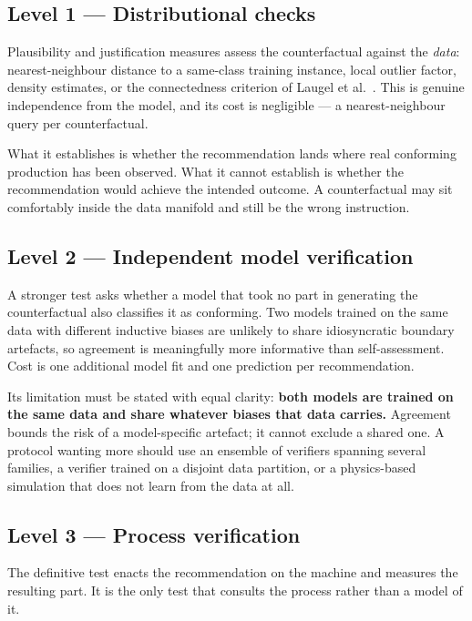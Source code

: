 \documentclass[11pt,a4paper]{article}
\begin{document}
\subsection*{Level 1 --- Distributional checks}

Plausibility and justification measures assess the counterfactual against the \emph{data}: nearest-neighbour distance to a same-class training instance, local outlier factor, density estimates, or the connectedness criterion of Laugel et al.~\cite{laugel2019}. This is genuine independence from the model, and its cost is negligible --- a nearest-neighbour query per counterfactual.

What it establishes is whether the recommendation lands where real conforming production has been observed. What it cannot establish is whether the recommendation would achieve the intended outcome. A counterfactual may sit comfortably inside the data manifold and still be the wrong instruction.

\subsection*{Level 2 --- Independent model verification}

A stronger test asks whether a model that took no part in generating the counterfactual also classifies it as conforming. Two models trained on the same data with different inductive biases are unlikely to share idiosyncratic boundary artefacts, so agreement is meaningfully more informative than self-assessment. Cost is one additional model fit and one prediction per recommendation.

Its limitation must be stated with equal clarity: \textbf{both models are trained on the same data and share whatever biases that data carries.} Agreement bounds the risk of a model-specific artefact; it cannot exclude a shared one. A protocol wanting more should use an ensemble of verifiers spanning several families, a verifier trained on a disjoint data partition, or a physics-based simulation that does not learn from the data at all.

\subsection*{Level 3 --- Process verification}

The definitive test enacts the recommendation on the machine and measures the resulting part. It is the only test that consults the process rather than a model of it.
\end{document}

